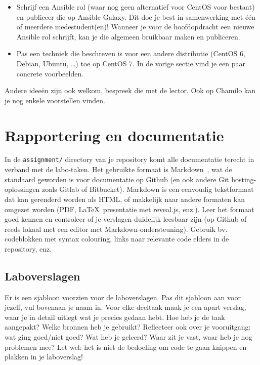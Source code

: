 \begin{itemize}
\item Schrijf een Ansible rol (waar nog geen alternatief voor CentOS voor bestaat) en publiceer die op Ansible Galaxy. Dit doe je best in samenwerking met één of meerdere medestudent(en)! Wanneer je voor de hoofdopdracht een nieuwe Ansible rol schrijft, kan je die algemeen bruikbaar maken en publiceren.
\item Pas een techniek die beschreven is voor een andere distributie (CentOS 6, Debian, Ubuntu, \ldots{}) toe op CentOS 7. In de vorige sectie vind je een paar concrete voorbeelden.
\end{itemize}

Andere ideeën zijn ook welkom, bespreek die met de lector. Ook op Chamilo kan je nog enkele voorstellen vinden.

\section{Rapportering en documentatie}
\label{sec:rapportering-en-documentatie}

In de \texttt{assignment/} directory van je repository komt alle documentatie terecht in verband met de labo-taken. Het gebruikte formaat is Markdown~\autocite{Gruber2004,Github2016}, wat de standaard geworden is voor documentatie op Github (en ook andere Git hosting-oplossingen zoals Gitlab of Bitbucket). Markdown is een eenvoudig tekstformaat dat kan gerenderd worden als HTML, of makkelijk naar andere formaten kan omgezet worden (PDF, \LaTeX\, presentatie met reveal.js, enz.). Leer het formaat goed kennen en controleer of je verslagen duidelijk leesbaar zijn (op Github of reeds lokaal met een editor met Markdown-ondersteuning). Gebruik bv. codeblokken met syntax colouring, links naar relevante code elders in de repository, enz.

\subsection{Laboverslagen}
\label{subs:laboverslagen}

Er is een sjabloon voorzien voor de laboverslagen. Pas dit sjabloon aan voor jezelf, vul bovenaan je naam in. Voor elke deeltaak maak je een apart verslag, waar je in detail uitlegt wat je precies gedaan hebt. Hoe heb je de taak aangepakt? Welke bronnen heb je gebruikt? Reflecteer ook over je vooruitgang: wat ging goed/niet goed? Wat heb je geleerd? Waar zit je vast, waar heb je nog problemen mee? Let wel: het is niet de bedoeling om code te gaan knippen en plakken in je laboverslag!

